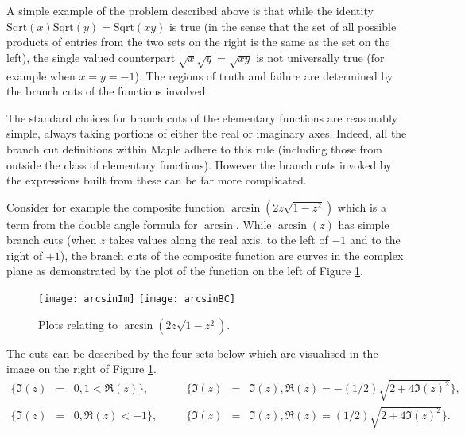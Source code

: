 \documentclass{llncs}
\begin{document}
A simple example of the problem described above is that while the identity
$
\mathrm{Sqrt}(x)\mathrm{Sqrt}(y) = \mathrm{Sqrt}(xy)
$
is true (in the sense that the set of all possible products of entries from the two sets on the right is the same as the set on the left), the single valued counterpart 
$\sqrt{x}\sqrt{y}=\sqrt{xy}$ is not universally true (for example when $x=y=-1$).  The regions of truth and failure are determined by the branch cuts of the functions involved.  

The standard choices for branch cuts of the elementary functions are reasonably simple, always taking portions of either the real or imaginary axes.  Indeed, all the branch cut definitions within {\sc Maple} adhere to this rule (including those from outside the class of elementary functions).  However the branch cuts invoked by the expressions built from these can be far more complicated.  

Consider for example the composite function $\arcsin(2z\sqrt{1-z^2})$ which is a term from the double angle formula for $\arcsin$.  While $\arcsin(z)$ has simple branch cuts (when $z$ takes values along the real axis, to the left of $-1$ and to the right of $+1$), the branch cuts of the composite function are curves in the complex plane as demonstrated by the plot of the function on the left of Figure \ref{fig:arcsin}.  

\begin{figure}[ht] 
\begin{center}
\texttt{[image: arcsinIm]}
\hspace*{0.3cm}
\texttt{[image: arcsinBC]}
\end{center}
\caption{Plots relating to $\arcsin(2z\sqrt{1-z^2})$.} 
\label{fig:arcsin}
\end{figure}
The cuts can be described by the four sets below which are visualised in the image on the right of Figure \ref{fig:arcsin}.
\begin{equation}
\label{eq:arcsin}
\begin{array}{rclcrcl}
\big\{\Im(z) &=& 0, 1 < \Re(z)\big\}, & \quad &
\big\{\Im(z) &=& \Im(z), \Re(z) = -(1/2)\sqrt{2+4\Im(z)^2}\big\},  \\
\big\{\Im(z) &=& 0, \Re(z) < -1\big\}, & \quad & 
\big\{\Im(z) &=& \Im(z), \Re(z) = (1/2)\sqrt{2+4\Im(z)^2}\big\}.
\end{array} 
\end{equation}
\end{document}
